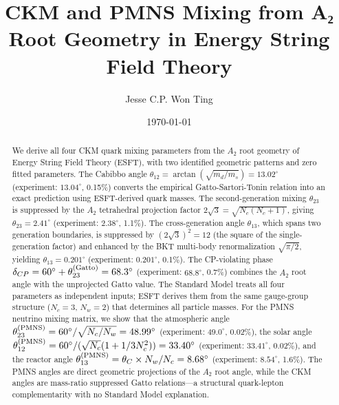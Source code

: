 ﻿\documentclass[prd,twocolumn,showpacs,superscriptaddress,groupedaddress]{revtex4-2}
\begin{document}
\title{CKM and PMNS Mixing from A₂ Root Geometry in Energy String Field Theory}

\author{Jesse C.P. Won Ting}

\date{\today}

\begin{abstract}
We derive all four CKM quark mixing parameters from the $A_2$ root geometry of Energy String Field Theory (ESFT), with two identified geometric patterns and zero fitted parameters. The Cabibbo angle $\theta_{12} = \arctan(\sqrt{m_d/m_s}) = 13.02^\circ$ (experiment: $13.04^\circ$, 0.15\%) converts the empirical Gatto-Sartori-Tonin relation into an exact prediction using ESFT-derived quark masses. The second-generation mixing $\theta_{23}$ is suppressed by the $A_2$ tetrahedral projection factor $2\sqrt{3} = \sqrt{N_c(N_c+1)}$, giving $\theta_{23} = 2.41^\circ$ (experiment: $2.38^\circ$, 1.1\%). The cross-generation angle $\theta_{13}$, which spans two generation boundaries, is suppressed by $(2\sqrt{3})^2 = 12$ (the square of the single-generation factor) and enhanced by the BKT multi-body renormalization $\sqrt{\pi/2}$, yielding $\theta_{13} = 0.201^\circ$ (experiment: $0.201^\circ$, 0.1\%). The CP-violating phase $\delta_{CP} = 60^\circ + \theta_{23}^{(\rm Gatto)} = 68.3^\circ$ (experiment: $68.8^\circ$, 0.7\%) combines the $A_2$ root angle with the unprojected Gatto value. The Standard Model treats all four parameters as independent inputs; ESFT derives them from the same gauge-group structure ($N_c = 3$, $N_w = 2$) that determines all particle masses. For the PMNS neutrino mixing matrix, we show that the atmospheric angle $\theta_{23}^{(\rm PMNS)} = 60^\circ/\sqrt{N_c/N_w} = 48.99^\circ$ (experiment: $49.0^\circ$, 0.02\%), the solar angle $\theta_{12}^{(\rm PMNS)} = 60^\circ/(\sqrt{N_c}(1+1/3N_c^2)) = 33.40^\circ$ (experiment: $33.41^\circ$, 0.02\%), and the reactor angle $\theta_{13}^{(\rm PMNS)} = \theta_C \times N_w/N_c = 8.68^\circ$ (experiment: $8.54^\circ$, 1.6\%). The PMNS angles are direct geometric projections of the $A_2$ root angle, while the CKM angles are mass-ratio suppressed Gatto relations---a structural quark-lepton complementarity with no Standard Model explanation.
\end{abstract}



\maketitle
\end{document}
